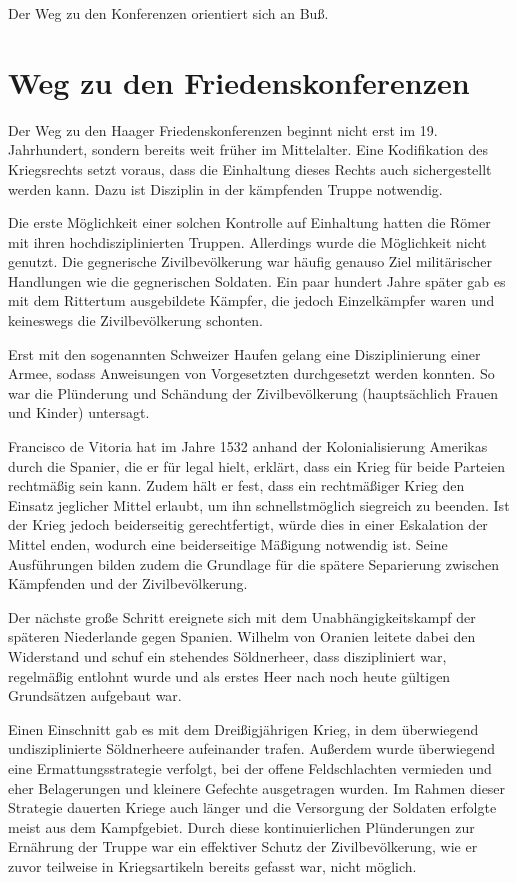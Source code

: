 \documentclass[12pt]{scrartcl}
\begin{document}
Der Weg zu den Konferenzen orientiert sich an Buß\cite{Buss1992}.
\section{Weg zu den Friedenskonferenzen}
Der Weg zu den Haager Friedenskonferenzen beginnt nicht erst im 19. Jahrhundert, sondern bereits weit früher im Mittelalter. Eine Kodifikation des Kriegsrechts setzt voraus, dass die Einhaltung dieses Rechts auch sichergestellt werden kann. Dazu ist Disziplin in der kämpfenden Truppe notwendig.

Die erste Möglichkeit einer solchen Kontrolle auf Einhaltung hatten die Römer mit ihren hochdisziplinierten Truppen. Allerdings wurde die Möglichkeit nicht genutzt. Die gegnerische Zivilbevölkerung war häufig genauso Ziel militärischer Handlungen wie die gegnerischen Soldaten. Ein paar hundert Jahre später gab es mit dem Rittertum ausgebildete Kämpfer, die jedoch Einzelkämpfer waren und keineswegs die Zivilbevölkerung schonten.

Erst mit den sogenannten Schweizer Haufen gelang eine Disziplinierung einer Armee, sodass Anweisungen von Vorgesetzten durchgesetzt werden konnten. So war die Plünderung und Schändung der Zivilbevölkerung (hauptsächlich Frauen und Kinder) untersagt.

Francisco de Vitoria hat im Jahre 1532 anhand der Kolonialisierung Amerikas durch die Spanier, die er für legal hielt, erklärt, dass ein Krieg für beide Parteien rechtmäßig sein kann. Zudem hält er fest, dass ein rechtmäßiger Krieg den Einsatz jeglicher Mittel erlaubt, um ihn schnellstmöglich siegreich zu beenden. Ist der Krieg jedoch beiderseitig gerechtfertigt, würde dies in einer Eskalation der Mittel enden, wodurch eine beiderseitige Mäßigung notwendig ist. Seine Ausführungen bilden zudem die Grundlage für die spätere Separierung zwischen Kämpfenden und der Zivilbevölkerung.

Der nächste große Schritt ereignete sich mit dem Unabhängigkeitskampf der späteren Niederlande gegen Spanien. Wilhelm von Oranien leitete dabei den Widerstand und schuf ein stehendes Söldnerheer, dass diszipliniert war, regelmäßig entlohnt wurde und als erstes Heer nach noch heute gültigen Grundsätzen aufgebaut war. 

Einen Einschnitt gab es mit dem Dreißigjährigen Krieg, in dem überwiegend undisziplinierte Söldnerheere aufeinander trafen. Außerdem wurde überwiegend eine Ermattungsstrategie verfolgt, bei der offene Feldschlachten vermieden und eher Belagerungen und kleinere Gefechte ausgetragen wurden. Im Rahmen dieser Strategie dauerten Kriege auch länger und die Versorgung der Soldaten erfolgte meist aus dem Kampfgebiet. Durch diese kontinuierlichen Plünderungen zur Ernährung der Truppe war ein effektiver Schutz der Zivilbevölkerung, wie er zuvor teilweise in Kriegsartikeln bereits gefasst war, nicht möglich.
\end{document}
